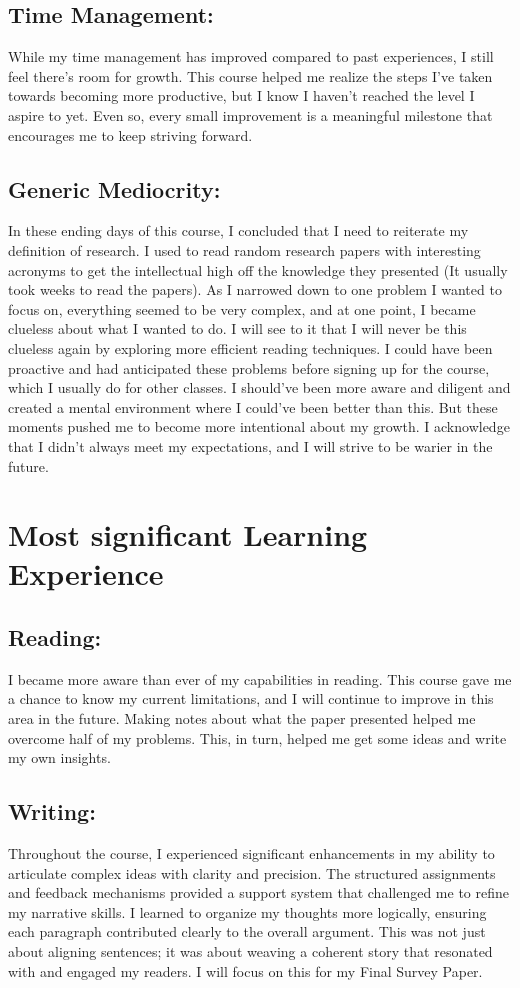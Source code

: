 \documentclass[10pt]{article}
\begin{document}
\subsection*{Time Management:}
While my time management has improved compared to past experiences, I still feel there's room for growth. This course helped me realize the steps I’ve taken towards becoming more productive, but I know I haven’t reached the level I aspire to yet. Even so, every small improvement is a meaningful milestone that encourages me to keep striving forward.

\subsection*{Generic Mediocrity: }
In these ending days of this course, I concluded that I need to reiterate my definition of research. I used to read random research papers with interesting acronyms to get the intellectual high off the knowledge they presented (It usually took weeks to read the papers). As I narrowed down to one problem I wanted to focus on, everything seemed to be very complex, and at one point, I became clueless about what I wanted to do. I will see to it that I will never be this clueless again by exploring more efficient reading techniques. I could have been proactive and had anticipated these problems before signing up for the course, which I usually do for other classes. I should've been more aware and diligent and created a mental environment where I could've been better than this. But these moments pushed me to become more intentional about my growth. I acknowledge that I didn't always meet my expectations, and I will strive to be warier in the future.

\section{Most significant Learning Experience}
\subsection*{Reading: }
I became more aware than ever of my capabilities in reading. This course gave me a chance to know my current limitations, and I will continue to improve in this area in the future. Making notes about what the paper presented helped me overcome half of my problems. This, in turn, helped me get some ideas and write my own insights.

\subsection*{Writing: }
Throughout the course, I experienced significant enhancements in my ability to articulate complex ideas with clarity and precision. The structured assignments and feedback mechanisms provided a support system that challenged me to refine my narrative skills. I learned to organize my thoughts more logically, ensuring each paragraph contributed clearly to the overall argument. This was not just about aligning sentences; it was about weaving a coherent story that resonated with and engaged my readers. I will focus on this for my Final Survey Paper.
\end{document}
